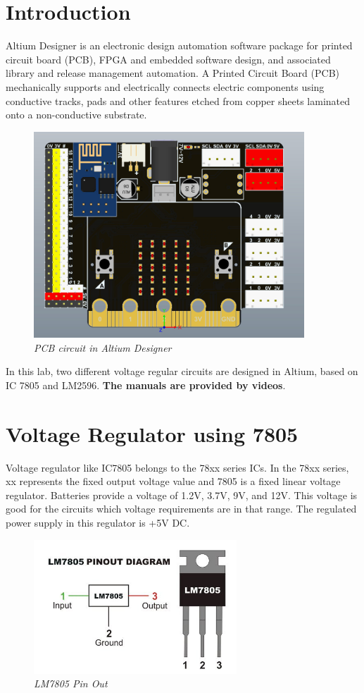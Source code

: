 \section{Introduction}
Altium Designer is an electronic design
automation software package for printed circuit board (PCB), FPGA and embedded software design, and associated library and release management automation. A Printed Circuit Board (PCB) mechanically supports and electrically connects electric components using conductive tracks, pads and other features etched from copper sheets laminated onto a non-conductive substrate.

\begin{figure}[!htp]
    \centering
    \includegraphics[width=4in]{source/picture/bai_4/bbc_altium.jpg}
    \caption{\textit{PCB circuit in Altium Designer}}
    \label{bai4_pic1}
\end{figure}


In this lab, two different voltage regular circuits are designed in Altium, based on IC 7805 and LM2596. \textbf{The manuals are provided by videos}. 

\section{Voltage Regulator using 7805}
Voltage regulator like IC7805 belongs to the 78xx series ICs. In the 78xx series, xx represents the fixed output voltage value and 7805 is a fixed linear voltage regulator. Batteries provide a voltage of 1.2V, 3.7V, 9V, and 12V. This voltage is good for the circuits which voltage requirements are in that range. The regulated power supply in this regulator is +5V DC. \\

\begin{figure}[!htp]
    \centering
    \includegraphics[width=3in]{source/picture/bai_4/LM7805_PinOut.jpg}
    \caption{\textit{LM7805 Pin Out}}
    \label{bai4_pic1}
\end{figure}

